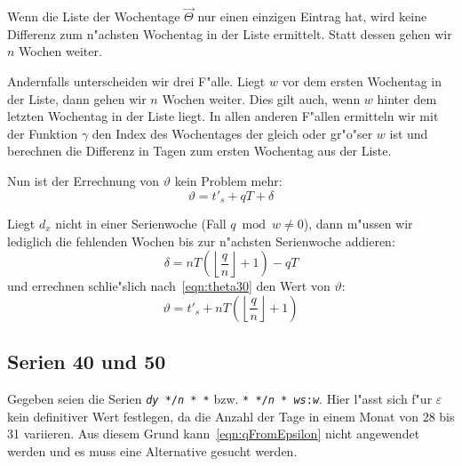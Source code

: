 \documentclass[a4paper]{article}
\numberwithin{equation}{section}
\begin{document}
\noindent Wenn die Liste der Wochentage $\vec{\Theta}$ nur einen einzigen
Eintrag hat, wird keine Differenz zum n"achsten Wochentag in der Liste
ermittelt. Statt dessen gehen wir $n$ Wochen weiter.

Andernfalls unterscheiden wir drei F"alle. Liegt $w$ vor dem ersten Wochentag in
der Liste, dann gehen wir $n$ Wochen weiter. Dies gilt auch, wenn $w$ hinter dem
letzten Wochentag in der Liste liegt. In allen anderen F"allen ermitteln wir mit
der Funktion $\gamma$ den Index des Wochentages der gleich oder gr"o"ser $w$ ist
und berechnen die Differenz in Tagen zum ersten Wochentag aus der Liste.

Nun ist der Errechnung von $\vartheta$ kein Problem mehr:
\begin{equation}\label{eqn:theta30}\vartheta = t'_s + qT + \delta\end{equation}

\noindent Liegt $d_x$ nicht in einer Serienwoche (Fall $q \bmod w \ne 0$), dann
m"ussen wir lediglich die fehlenden Wochen bis zur n"achsten Serienwoche
addieren:
\begin{equation}
  \delta = nT(\left\lfloor\frac{q}{n}\right\rfloor + 1) - qT
\end{equation}
und errechnen schlie"slich nach~\eqref{eqn:theta30} den Wert von $\vartheta$:
\begin{equation}
  \vartheta = t'_s + nT(\left\lfloor\frac{q}{n}\right\rfloor + 1)
\end{equation}


%
%
\subsection{Serien 40 und 50}\label{ssec:approx40_50}
Gegeben seien die Serien \texttt{\textit{dy} */\textit{n} * *} bzw.
\texttt{* */\textit{n} * \textit{ws}:\textit{w}}. Hier l"asst sich f"ur
$\varepsilon$ kein definitiver Wert festlegen, da die Anzahl der Tage in einem
Monat von 28 bis 31 variieren. Aus diesem Grund kann~\eqref{eqn:qFromEpsilon}
nicht angewendet werden und es muss eine Alternative gesucht werden.
\end{document}
